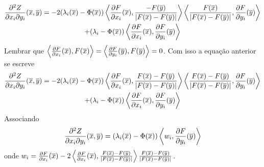 \begin{demonstracao}
	\begin{multline*}
		\frac{\partial^2 Z}{\partial x_i \partial y_i}(\overline{x},\overline{y}) = -2 (\lambda_i(\overline{x}) - \Phi(\overline{x})) \left\langle \frac{\partial F}{\partial x_i}(\overline{x}), \frac{-F(\overline{y})}{|F(\overline{x}) - F(\overline{y})|} \right\rangle \left\langle \frac{F(\overline{x})}{|F(\overline{x}) - F(\overline{y})|}, \frac{\partial F}{\partial y_i}(\overline{y}) \right\rangle\\
		+ (\lambda_i - \Phi(\overline{x})) \left\langle \frac{\partial F}{\partial x_i}(\overline{x}), \frac{\partial F}{\partial y_i}(\overline{y}) \right\rangle
	\end{multline*}	
	Lembrar que $\left\langle \frac{\partial F}{\partial x_i}(\overline{x}), F(\overline{x}) \right\rangle = \left\langle \frac{\partial F}{\partial y_i}(\overline{y}), F(\overline{y}) \right\rangle = 0$. Com isso a equação anterior se escreve
	\begin{multline*}
	\frac{\partial^2 Z}{\partial x_i \partial y_i}(\overline{x},\overline{y}) = -2 (\lambda_i(\overline{x}) - \Phi(\overline{x})) \left\langle \frac{\partial F}{\partial x_i}(\overline{x}), \frac{F(\overline{x}) -F(\overline{y})}{|F(\overline{x}) - F(\overline{y})|} \right\rangle \left\langle \frac{F(\overline{x}) - F(\overline{y})}{|F(\overline{x}) - F(\overline{y})|}, \frac{\partial F}{\partial y_i}(\overline{y}) \right\rangle\\
	+ (\lambda_i - \Phi(\overline{x})) \left\langle \frac{\partial F}{\partial x_i}(\overline{x}), \frac{\partial F}{\partial y_i}(\overline{y}) \right\rangle
	\end{multline*}	
	Associando
	\begin{equation*}
	\frac{\partial^2 Z}{\partial x_i \partial y_i}(\overline{x},\overline{y}) = (\lambda_i(\overline{x}) - \Phi(\overline{x}))  \left\langle w_i , \frac{\partial F}{\partial y_i}(\overline{y}) \right\rangle
	\end{equation*}	
	onde $w_i = \frac{\partial F}{\partial x_i}(\overline{x})  -2 \left\langle \frac{\partial F}{\partial x_i}(\overline{x}), \frac{F(\overline{x}) -F(\overline{y})}{|F(\overline{x}) - F(\overline{y})|} \right\rangle \frac{F(\overline{x}) - F(\overline{y})}{|F(\overline{x}) - F(\overline{y})|}$.
\end{demonstracao}


